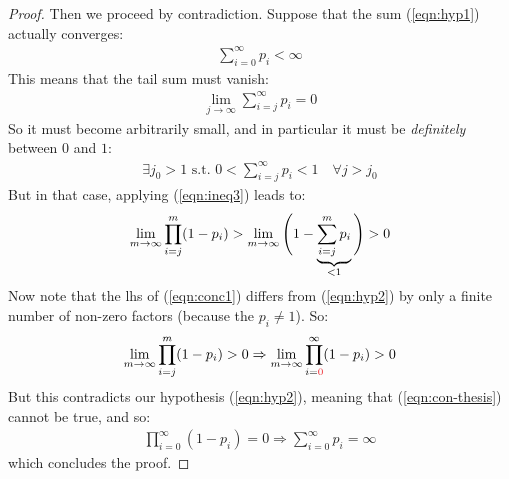 \documentclass[../template.tex]{subfiles}
\begin{document}
\begin{proof}
    Then we proceed by contradiction. Suppose that the sum (\ref{eqn:hyp1}) actually converges:
    \begin{align}\label{eqn:con-thesis}
        \sum_{i=0}^\infty p_i < \infty
    \end{align}
    This means that the tail sum must vanish:
    \begin{align*}
        \lim_{j \to \infty} \sum_{i=j}^\infty p_i = 0
    \end{align*}
    So it must become arbitrarily small, and in particular it must be \textit{definitely} between $0$ and $1$:
    \begin{align}\label{eqn:01}
        \exists j_0 > 1 \text{ s.t. } 0 < \sum_{i=j}^\infty p_i < 1 \quad \forall j > j_0
    \end{align} 
    But in that case, applying (\ref{eqn:ineq3}) leads to:
    \begin{align}\label{eqn:conc1}
        \lim_{m \to \infty} \prod_{i=j}^m (1-p_i) > \lim_{m \to \infty} \Bigg(1- \underbrace{\sum_{i=j}^m p_i}_{\mathclap{<1}} \Bigg) > 0
    \end{align}
    Now note that the lhs of (\ref{eqn:conc1}) differs from (\ref{eqn:hyp2}) by only a finite number of non-zero factors (because the $p_i \neq 1$). So:
    \begin{align*}
        \lim_{m \to \infty} \prod_{i=j}^m (1-p_i) > 0 \Rightarrow \lim_{m \to \infty} \prod_{i=\textcolor{Red}{0}}^\infty(1-p_i) > 0
    \end{align*}
    But this contradicts our hypothesis (\ref{eqn:hyp2}), meaning that (\ref{eqn:con-thesis}) cannot be true, and so:
    \begin{align*}
        \prod_{i=0}^\infty (1-p_i) = 0 \Rightarrow \sum_{i=0}^\infty p_i = \infty
    \end{align*}
    which concludes the proof.

\end{proof}
\end{document}
